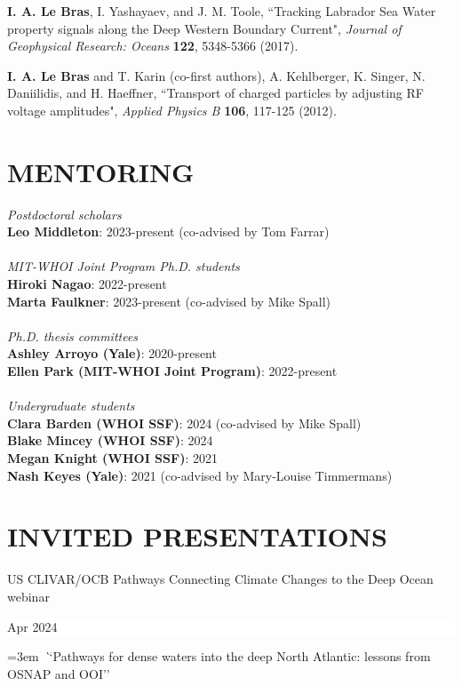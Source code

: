 \documentclass[paper=letter,fontsize=11pt]{scrartcl} %
\newcommand{\sepspace}{\vspace*{3mm}}		%
\newcommand{\NewPart}[2]{\section*{\uppercase{#1} #2}}
\newcommand{\ShortEntry}[2]{\normalsize \noindent \textbf{#1}: #2 \\ }
\newcommand{\PaperEntry}[6]{
		\noindent #1, ``#2", \textit{#3} \textbf{#4}, #5 (#6).}
\newcommand{\TalkEntry}[3]{
		\noindent #1 \hfill      %
		\colorbox{White}{%
			\parbox{6em}{%
			\hfill\color{Black}#2}} \par  %
		\noindent\hangindent=3em\hangafter=0 \textit ``#3''\sepspace} %
\begin{document}
\begin{etaremune}
\item \PaperEntry{\textbf{I. A. Le Bras}, I. Yashayaev, and J. M. Toole}{Tracking Labrador Sea Water property signals along the Deep Western Boundary Current}{ Journal of Geophysical Research: Oceans}{122}{5348-5366}{2017}

\item \PaperEntry{\textbf{I. A. Le Bras} and T. Karin (co-first authors), A. Kehlberger, K. Singer, N. Daniilidis, and H. Haeffner}{Transport of charged particles by adjusting RF voltage amplitudes}{Applied Physics B}{106}{117-125}{2012}

\end{etaremune}



\NewPart{Mentoring}{}

\emph{Postdoctoral scholars}\\
\ShortEntry{Leo Middleton}{2023-present (co-advised by Tom Farrar)}\\
\emph{MIT-WHOI Joint Program Ph.D. students}\\
\ShortEntry{Hiroki Nagao}{2022-present}
\ShortEntry{Marta Faulkner}{2023-present (co-advised by Mike Spall)}\\
\emph{Ph.D. thesis committees}\\
\ShortEntry{Ashley Arroyo (Yale)}{2020-present}
\ShortEntry{Ellen Park (MIT-WHOI Joint Program)}{2022-present}\\
\emph{Undergraduate students}\\
\ShortEntry{Clara Barden (WHOI SSF)}{2024 (co-advised by Mike Spall)}
\ShortEntry{Blake Mincey (WHOI SSF)}{2024}
\ShortEntry{Megan Knight (WHOI SSF)}{2021}
\ShortEntry{Nash Keyes (Yale)}{2021  (co-advised by Mary-Louise Timmermans)}

\NewPart{Invited presentations}{}

\TalkEntry{US CLIVAR/OCB Pathways Connecting Climate Changes to the Deep Ocean webinar}{Apr 2024}{Pathways for dense waters into the deep North Atlantic: lessons from OSNAP and OOI}
\end{document}

